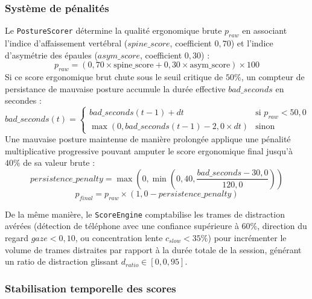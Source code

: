\subsubsection{Système de pénalités}

Le \texttt{PostureScorer} détermine la qualité ergonomique brute $p_{raw}$ en associant l'indice d'affaissement vertébral ($spine\_score$, coefficient $0,70$) et l'indice d'asymétrie des épaules ($asym\_score$, coefficient $0,30$) :
\begin{equation}
    p_{raw} = \left(0,70 \times \text{spine\_score} + 0,30 \times \text{asym\_score}\right) \times 100
\end{equation}
Si ce score ergonomique brut chute sous le seuil critique de $50\%$, un compteur de persistance de mauvaise posture accumule la durée effective $bad\_seconds$ en secondes :
\begin{equation}
    bad\_seconds(t) = \begin{cases} 
        bad\_seconds(t-1) + dt & \text{si } p_{raw} < 50,0 \\
        \max\left(0, bad\_seconds(t-1) - 2,0 \times dt\right) & \text{sinon}
    \end{cases}
\end{equation}
Une mauvaise posture maintenue de manière prolongée applique une pénalité multiplicative progressive pouvant amputer le score ergonomique final jusqu'à $40\%$ de sa valeur brute :
\begin{equation}
    persistence\_penalty = \max\left(0, \min\left(0,40, \frac{bad\_seconds - 30,0}{120,0}\right)\right)
\end{equation}
\begin{equation}
    p_{final} = p_{raw} \times (1,0 - persistence\_penalty)
\end{equation}

De la même manière, le \texttt{ScoreEngine} comptabilise les trames de distraction avérées (détection de téléphone avec une confiance supérieure à $60\%$, direction du regard $gaze < 0,10$, ou concentration lente $c_{slow} < 35\%$) pour incrémenter le volume de trames distraites par rapport à la durée totale de la session, générant un ratio de distraction glissant $d_{ratio} \in [0, 0,95]$.

\subsubsection{Stabilisation temporelle des scores}

